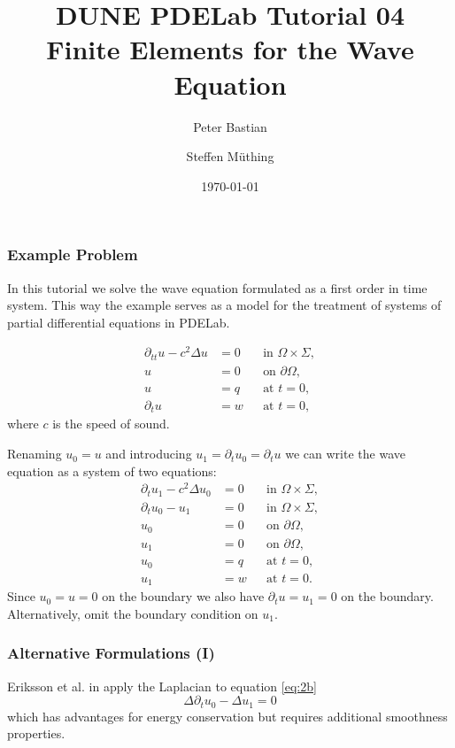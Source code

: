 \documentclass[ignorenonframetext,11pt]{beamer}
\title{DUNE PDELab Tutorial 04\\
  {\small Finite Elements for the Wave Equation}}
\author{Peter Bastian \and Steffen Müthing}
\institute[]
  {
   Interdisziplinäres Zentrum für Wissenschaftliches Rechnen\\
   Im Neuenheimer Feld 205, D-69120 Heidelberg \\[6pt]
  }
\date[\today]{\today}
\theoremstyle{definition}
\begin{document}
\frame{\titlepage}



\begin{frame}
\frametitle{Example Problem}
 In this tutorial we solve the wave equation formulated as a first order
in time system. This way the example serves as a model for the
treatment of systems of partial differential equations in PDELab.

\begin{subequations}
\label{eq:WaveEquation}
\begin{align}
\partial_{tt} u-c^2\Delta u  &= 0 &&\text{in $\Omega\times\Sigma$},\\
u &= 0 &&\text{on $\partial\Omega$},\\
u &= q &&\text{at $t=0$},\\
\partial_t u &= w &&\text{at $t=0$},
\end{align}
\end{subequations}
where $c$ is the speed of sound.
\end{frame}
\begin{frame}
Renaming $u_0=u$ and introducing $u_1=\partial_t u_0 =\partial_t u$ we can write the wave equation as a system of two equations:
\begin{subequations}
\label{eq:SystemForm1}
\begin{align}
\partial_t u_1 - c^2\Delta u_0 &=0 &&\text{in $\Omega\times\Sigma$}, \label{eq:2a}\\
\partial_t u_0 - u_1 &=0 &&\text{in $\Omega\times\Sigma$}, \label{eq:2b}\\
u_0 &= 0 &&\text{on $\partial\Omega$},\\
u_1 &= 0 &&\text{on $\partial\Omega$},\\
u_0 &= q &&\text{at $t=0$},\\
u_1 &= w &&\text{at $t=0$}.
\end{align}
\end{subequations}
Since $u_0=u=0$ on the boundary we also have $\partial_t u = u_1 = 0$ on the boundary.
Alternatively, omit the boundary condition on $u_1$.
\end{frame}


\begin{frame}
\frametitle{Alternative Formulations (I)}
Eriksson et al. in \cite{Eriksson} apply the Laplacian to
equation \eqref{eq:2b}
\begin{equation}
\Delta \partial_t u_0 - \Delta u_1 = 0
\end{equation} \label{eq:Eriksson}
which has advantages for energy conservation but requires additional smoothness
properties.
\end{frame}
\end{document}
